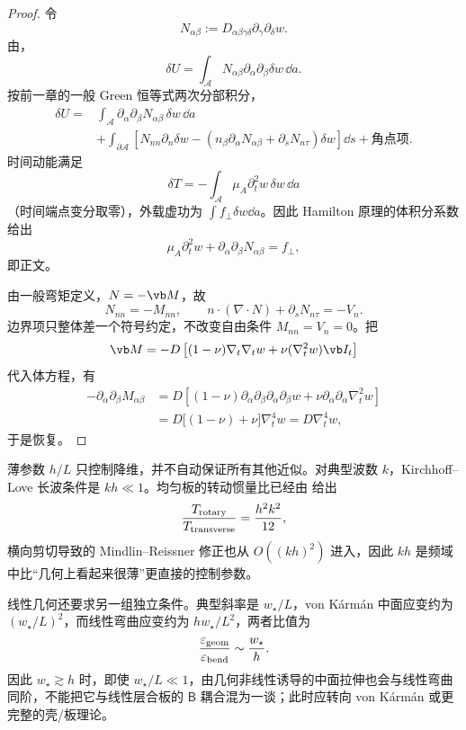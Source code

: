 \begin{proof}
令
\[
 N_{\alpha\beta}
 :=D_{\alpha\beta\gamma\delta}\partial_\gamma\partial_\delta w.
\]
由，
\[
 \delta U
 =\int_{\mathcal A}N_{\alpha\beta}\partial_\alpha\partial_\beta\delta w\,\dd a.
\]
按前一章的一般 Green 恒等式两次分部积分，
\begin{align*}
 \delta U
 ={}&\int_{\mathcal A}
 \partial_\alpha\partial_\beta N_{\alpha\beta}\,\delta w\,\dd a\\
 &+\int_{\partial\mathcal A}
 \left[N_{nn}\partial_n\delta w
 -\left(n_\beta\partial_\alpha N_{\alpha\beta}
 +\partial_sN_{n\tau}\right)\delta w\right]\dd s
 +\text{角点项}.
\end{align*}
时间动能满足
\[
 \delta T
 =-\int_{\mathcal A}\mu_A\partial_t^2w\,\delta w\,\dd a
\]
（时间端点变分取零），外载虚功为 \(\int f_\perp\delta w\dd a\)。因此 Hamilton 原理的体积分系数给出
\[
 \mu_A\partial_t^2w
 +\partial_\alpha\partial_\beta N_{\alpha\beta}=f_\perp,
\]
即正文。

由一般弯矩定义，\(N=-\vb M\)，故
\[
 N_{nn}=-M_{nn},
 \qquad
 n\cdot(\nabla\cdot N)+\partial_sN_{n\tau}=-V_n.
\]
边界项只整体差一个符号约定，不改变自由条件 \(M_{nn}=V_n=0\)。把
\[
 \vb M=-D\left[(1-\nu)\nabla_t\nabla_t w
 +\nu(\nabla_t^2w)\vb I_t\right]
\]
代入体方程，有
\begin{align*}
 -\partial_\alpha\partial_\beta M_{\alpha\beta}
 &=D\left[(1-\nu)\partial_\alpha\partial_\beta
 \partial_\alpha\partial_\beta w
 +\nu\partial_\alpha\partial_\alpha\nabla_t^2w\right]\\
 &=D\bigl[(1-\nu)+\nu\bigr]\nabla_t^4w
 =D\nabla_t^4w,
\end{align*}
于是恢复。
\end{proof}

薄参数 \(h/L\) 只控制降维，并不自动保证所有其他近似。对典型波数 \(k\)，Kirchhoff--Love 长波条件是 \(kh\ll1\)。均匀板的转动惯量比已经由 给出
\[
 \frac{T_{\rm rotary}}{T_{\rm transverse}}
 =\frac{h^2k^2}{12},
\]
横向剪切导致的 Mindlin--Reissner 修正也从 \(O((kh)^2)\) 进入，因此 \(kh\) 是频域中比“几何上看起来很薄”更直接的控制参数。

线性几何还要求另一组独立条件。典型斜率是 \(w_\star/L\)，von K\'arm\'an 中面应变约为 \((w_\star/L)^2\)，而线性弯曲应变约为 \(hw_\star/L^2\)，两者比值为
\begin{equation}
 \frac{\varepsilon_{\rm geom}}{\varepsilon_{\rm bend}}
 \sim\frac{w_\star}{h}.
 \label{eq:phys-cont-kl-geometric-control}
\end{equation}
因此 \(w_\star\gtrsim h\) 时，即使 \(w_\star/L\ll1\)，由几何非线性诱导的中面拉伸也会与线性弯曲同阶，不能把它与线性层合板的 \(\mathsf B\) 耦合混为一谈；此时应转向 von K\'arm\'an 或更完整的壳/板理论。

